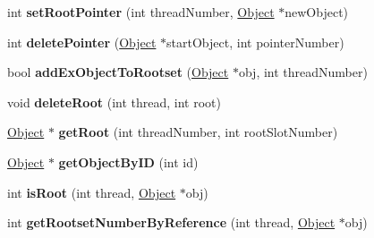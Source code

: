 \begin{DoxyCompactItemize}
\item 
\hypertarget{classtrace_gen_1_1_memory_manager_a5941aaa7ca195873247f22aa57de9961}{}int {\bfseries set\+Root\+Pointer} (int thread\+Number, \hyperlink{classtrace_gen_1_1_object}{Object} $\ast$new\+Object)\label{classtrace_gen_1_1_memory_manager_a5941aaa7ca195873247f22aa57de9961}

\item 
\hypertarget{classtrace_gen_1_1_memory_manager_a07bb0660c38459d6763bb3d8cf11b362}{}int {\bfseries delete\+Pointer} (\hyperlink{classtrace_gen_1_1_object}{Object} $\ast$start\+Object, int pointer\+Number)\label{classtrace_gen_1_1_memory_manager_a07bb0660c38459d6763bb3d8cf11b362}

\item 
\hypertarget{classtrace_gen_1_1_memory_manager_a60b55fff969a80b439f4adf7bb1fe8ae}{}bool {\bfseries add\+Ex\+Object\+To\+Rootset} (\hyperlink{classtrace_gen_1_1_object}{Object} $\ast$obj, int thread\+Number)\label{classtrace_gen_1_1_memory_manager_a60b55fff969a80b439f4adf7bb1fe8ae}

\item 
\hypertarget{classtrace_gen_1_1_memory_manager_a9ce81944f1d28b8bccb0fafca69b66f6}{}void {\bfseries delete\+Root} (int thread, int root)\label{classtrace_gen_1_1_memory_manager_a9ce81944f1d28b8bccb0fafca69b66f6}

\item 
\hypertarget{classtrace_gen_1_1_memory_manager_a1e373c7242908e0810e4a75c45987852}{}\hyperlink{classtrace_gen_1_1_object}{Object} $\ast$ {\bfseries get\+Root} (int thread\+Number, int root\+Slot\+Number)\label{classtrace_gen_1_1_memory_manager_a1e373c7242908e0810e4a75c45987852}

\item 
\hypertarget{classtrace_gen_1_1_memory_manager_aa924535d1ca49e2f08a0e533c9002e72}{}\hyperlink{classtrace_gen_1_1_object}{Object} $\ast$ {\bfseries get\+Object\+By\+I\+D} (int id)\label{classtrace_gen_1_1_memory_manager_aa924535d1ca49e2f08a0e533c9002e72}

\item 
\hypertarget{classtrace_gen_1_1_memory_manager_ade49b58f60038f85fad117d0c0099e10}{}int {\bfseries is\+Root} (int thread, \hyperlink{classtrace_gen_1_1_object}{Object} $\ast$obj)\label{classtrace_gen_1_1_memory_manager_ade49b58f60038f85fad117d0c0099e10}

\item 
\hypertarget{classtrace_gen_1_1_memory_manager_af35062ff00c818952d42e46ac876b558}{}int {\bfseries get\+Rootset\+Number\+By\+Reference} (int thread, \hyperlink{classtrace_gen_1_1_object}{Object} $\ast$obj)\label{classtrace_gen_1_1_memory_manager_af35062ff00c818952d42e46ac876b558}


\end{DoxyCompactItemize}
